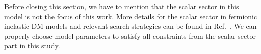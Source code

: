 \documentclass[preprint, superscriptaddress,amsmath, nofootinbib]{revtex4-1}
\begin{document}
{Before closing this section, we have to mention that the scalar sector in this model is not the focus of this work. More details for the scalar sector in fermionic inelastic DM models and relevant search strategies can be found in Ref.~\cite{Duerr:2020muu,Kang:2021oes,Li:2021rzt}. We can properly choose model parameters to satisfy all constraints from the scalar sector part in this study. 
}

\end{document}

